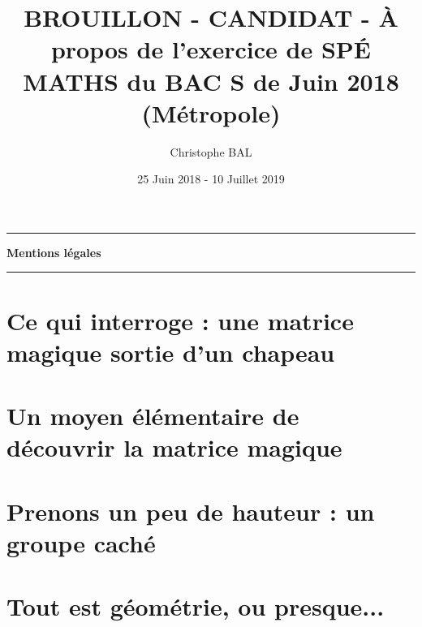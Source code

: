 \documentclass[12pt]{amsart}
\newcommand\squote[1]{\og #1 \fg{}}
\begin{document}
\title{BROUILLON - CANDIDAT - À propos de l'exercice de SPÉ MATHS du BAC S de Juin 2018 (Métropole)}
\author{Christophe BAL}
\date{25 Juin 2018 - 10 Juillet 2019}
\maketitle


\begin{center}
	\hrule\vspace{.3em}
	{
		\fontsize{1.35em}{1em}\selectfont
		\textbf{Mentions \og légales \fg}
	}
			
	\vspace{0.45em}
	\doclicenseThis
	\hrule
\end{center}



\setcounter{tocdepth}{2}
\tableofcontents



\section{Ce qui interroge : une matrice \squote{magique} sortie d'un chapeau}





\section{Un moyen élémentaire de découvrir la matrice \squote{magique}}





\section{Prenons un peu de hauteur : un groupe \squote{caché}}





\section{Tout est géométrie, ou presque...}


\end{document}
